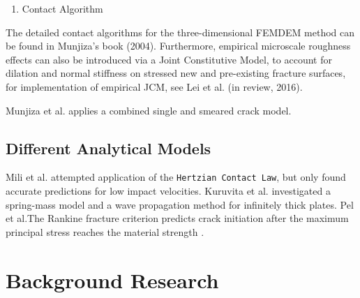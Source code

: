 \documentclass[format=acmtog, 12pt, screen=true, review=false]{acmart}
\begin{document}
\begin{enumerate}
    \item Contact Algorithm \cite{Mun}
\end{enumerate}

The detailed contact algorithms for the three-dimensional FEMDEM method can be found in Munjiza’s book (2004). Furthermore, empirical microscale roughness effects can also be introduced via a Joint Constitutive Model, to account for dilation and normal stiffness on stressed new and pre-existing fracture surfaces, for implementation of empirical JCM, see Lei et al. (in review, 2016).

Munjiza et al. \cite{Mun99} applies a combined single and smeared crack model. 

\subsection{Different Analytical Models}

Mili et al. \cite{Mil12} attempted application of the \texttt{Hertzian Contact Law}, but only found accurate predictions for low impact velocities. Kuruvita et al. \cite{Kur14} investigated a spring-mass model and a wave propagation method for infinitely thick plates. Pel et al.The Rankine fracture criterion predicts crack initiation after the maximum principal stress reaches the material strength \cite{Pel16}.

\section{Background Research}



\end{document}
